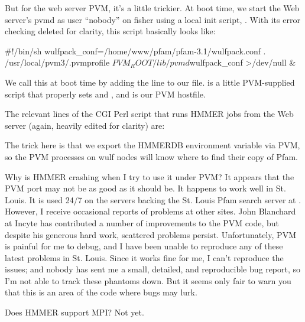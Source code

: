 But for the web server PVM, it's a little trickier. At boot time, we
start the Web server's pvmd as user ``nobody'' on fisher using a local
init script, . With its error
checking deleted for clarity, this script basically looks like:

\begin{sreoutput}
#!/bin/sh
wulfpack_conf=/home/www/pfam/pfam-3.1/wulfpack.conf
. /usr/local/pvm3/.pvmprofile
$PVM_ROOT/lib/pvmd $wulfpack_conf >/dev/null &
\end{sreoutput}

We call this at boot time by adding the line  to our 
file.  is a little PVM-supplied script that properly
sets  and , and 
is our PVM hostfile.

The relevant lines of the CGI Perl script that runs HMMER jobs from
the Web server (again, heavily edited for clarity) are:


The trick here is that we export the HMMERDB environment variable via
PVM, so the PVM processes on wulf nodes will know where to find their
copy of Pfam.

\begin{srefaq}{Why is HMMER crashing when I try to use it under PVM?}
It appears that the PVM port may not be as good as it should be. It
happens to work well in St. Louis. It is used 24/7 on the servers
backing the St. Louis Pfam search server at
.
However, I receive occasional reports of problems at other
sites. John Blanchard at Incyte has contributed a number of
improvements to the PVM code, but despite his generous hard work, scattered problems
persist. Unfortunately, PVM is painful for me to debug, and I have been
unable to reproduce any of these latest problems in St. Louis. Since it works
fine for me, I can't reproduce the issues; and nobody has sent me a small,
detailed, and reproducible bug report, so I'm not able to track these
phantoms down. But it seems only fair to warn you that this is an area
of the code where bugs may lurk.
\end{srefaq}

\begin{srefaq}{Does HMMER support MPI?}
Not yet.
\end{srefaq}








